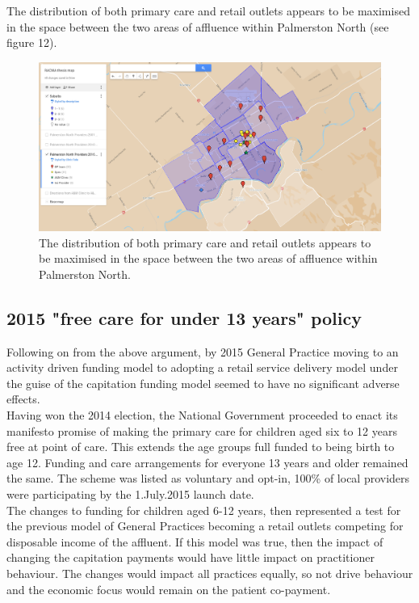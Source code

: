 \documentclass[11pt,a4paper]{article}
\begin{document}
The distribution of both primary care and retail outlets appears to be maximised in the space between the two areas of affluence within Palmerston North (see figure 12).\\

\begin{figure}[htp]
\centering
\includegraphics[scale=0.30]{fig12.png}
\caption{The distribution of both primary care and retail outlets appears to be maximised in the space between the two areas of affluence within Palmerston North.}
\label{Distribution of General Practitioners overlaid on suburb's social deprivation}
\end{figure}

\pagebreak
\subsection{2015 "free care for under 13 years" policy}
Following on from the above argument, by 2015 General Practice moving to an activity driven funding model to adopting a retail service delivery model under the guise of the capitation funding model seemed to have no significant adverse effects.\\

Having won the 2014 election, the National Government proceeded to enact its manifesto promise of making the primary care for children aged six to 12 years free at point of care. This extends the age groups full funded to being birth to age 12. Funding and care arrangements for everyone 13 years and older remained the same. The scheme was listed as voluntary and opt-in, 100\% of local providers were participating by the 1.July.2015 launch date.\\

The changes to funding for children aged 6-12 years, then represented a test for the previous model of General Practices becoming a retail outlets competing for disposable income of the affluent. If this model was true, then the impact of changing the capitation payments would have little impact on practitioner behaviour. The changes would impact all practices equally, so not drive behaviour and the economic focus would remain on the patient co-payment.\\
\end{document}
